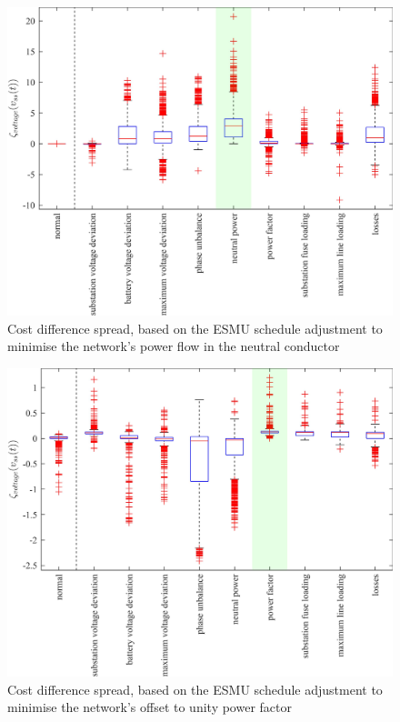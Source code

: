 \begin{figure}\centering
	\includegraphics{_chapter1/fig/appendix/minimising-neutral-power}
	\caption{Cost difference spread, based on the ESMU schedule adjustment to minimise the network's power flow in the neutral conductor}
\end{figure}

\begin{figure}\centering
	\includegraphics{_chapter1/fig/appendix/minimising-power-factor}
	\caption{Cost difference spread, based on the ESMU schedule adjustment to minimise the network's offset to unity power factor}
\end{figure}

